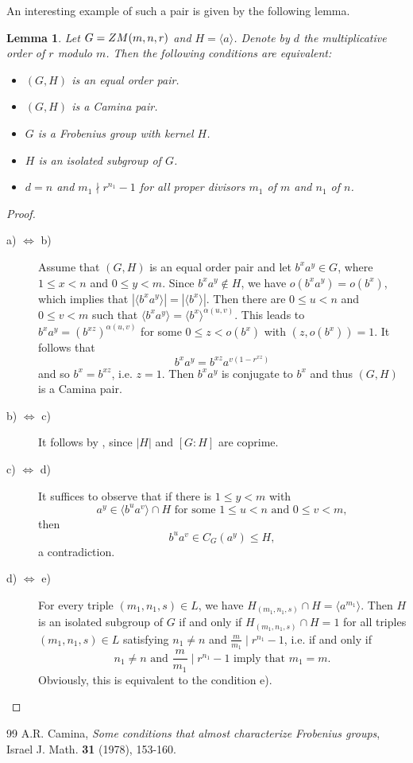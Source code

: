 \documentclass[10pt,a4paper]{amsart}
\newtheorem{lemma}[theorem]{Lemma}
\newcommand{\0}{{\leqno}}
\begin{document}
An interesting example of such a pair is given by the following lemma. 


\begin{lemma}
Let $G={\rm ZM}(m,n,r)$ and $H=\langle a\rangle$. Denote by $d$ the multiplicative order of $r$ modulo $m$. Then the following conditions are equivalent: 
\begin{itemize}
\item[{\rm a)}] $(G,H)$ is an equal order pair.
\item[{\rm b)}] $(G,H)$ is a Camina pair.
\item[{\rm c)}] $G$ is a Frobenius group with kernel $H$.
\item[{\rm d)}] $H$ is an isolated subgroup of $G$.
\item[{\rm e)}] $d=n$ and $m_1\nmid r^{n_1}-1$ for all proper divisors $m_1$ of $m$ and $n_1$ of $n$.
\end{itemize}
\end{lemma}

\begin{proof}
\begin{description}
\item[{\rm a)} $\Leftrightarrow$ {\rm b)}] Assume that $(G,H)$ is an equal order pair and let $b^xa^y\in G$, where $1\leq x<n$ and $0\leq y<m$. Since $b^xa^y\not\in H$, we have $o(b^xa^y)=o(b^x)$, which implies that $|\langle b^xa^y\rangle|=|\langle b^x\rangle|$. Then there are $0\leq u<n$ and $0\leq v<m$ such that $\langle b^xa^y\rangle=\langle b^x\rangle^{\alpha(u,v)}$. This leads to $b^xa^y=(b^{xz})^{\alpha(u,v)}$ for some $0\leq z<o(b^x)$ with $(z,o(b^x))=1$. It follows that
\begin{equation}
b^xa^y=b^{xz}a^{v(1-r^{xz})}\nonumber    
\end{equation}and so $b^x=b^{xz}$, i.e. $z=1$. Then $b^xa^y$ is conjugate to $b^x$ and thus $(G,H)$ is a Camina pair.
\item[{\rm b)} $\Leftrightarrow$ {\rm c)}] It follows by \cite{6}, since $|H|$ and $[G:H]$ are coprime.
\item[{\rm c)} $\Leftrightarrow$ {\rm d)}] It suffices to observe that if there is $1\leq y<m$ with
\begin{equation}
a^y\in\langle b^ua^v\rangle\cap H \mbox{ for some } 1\leq u<n \mbox{ and } 0\leq v<m,\nonumber 
\end{equation}then 
\begin{equation}
b^ua^v\in C_G(a^y)\leq H,\nonumber 
\end{equation}a contradiction.
\item[{\rm d)} $\Leftrightarrow$ {\rm e)}] For every triple $(m_1,n_1,s)\in L$, we have $H_{(m_1,n_1,s)}\cap H=\langle a^{m_1}\rangle$. Then $H$ is an isolated subgroup of $G$ if and only if $H_{(m_1,n_1,s)}\cap H=1$ for all triples $(m_1,n_1,s)\in L$ satisfying $n_1\neq n$ and $\frac{m}{m_1}\mid r^{n_1}-1$, i.e. if and only if
\begin{equation}
n_1\neq n \mbox{ and } \frac{m}{m_1}\mid r^{n_1}-1 \mbox{ imply that } m_1=m.\nonumber 
\end{equation}Obviously, this is equivalent to the condition e).
\end{description}
\end{proof}


\begin{thebibliography}{99}
 A.R. Camina, {\it Some conditions that almost characterize Frobenius groups}, Israel J. Math. {\bf 31} (1978), 153-160.
\end{thebibliography}
\end{document}
